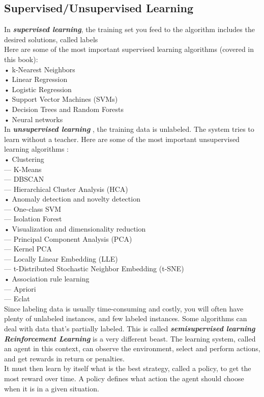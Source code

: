 \subsection*{Supervised/Unsupervised Learning}
In \textbf{\textit{supervised learning}}, the training set you feed to the algorithm includes the desired
solutions, called labels\\
Here are some of the most important supervised learning algorithms (covered in this
book):\\
• k-Nearest Neighbors\\
• Linear Regression\\
• Logistic Regression\\
• Support Vector Machines (SVMs)\\
• Decision Trees and Random Forests\\
• Neural networks\\

In \textbf{\textit{unsupervised learning}} , the training data is unlabeled. The system tries to learn without a teacher.
Here are some of the most important unsupervised learning algorithms :\\
• Clustering\\
— K-Means\\
— DBSCAN\\
— Hierarchical Cluster Analysis (HCA)\\
• Anomaly detection and novelty detection\\
— One-class SVM\\
— Isolation Forest\\
• Visualization and dimensionality reduction\\
— Principal Component Analysis (PCA)\\
— Kernel PCA\\
— Locally Linear Embedding (LLE)\\
— t-Distributed Stochastic Neighbor Embedding (t-SNE)\\
• Association rule learning\\
— Apriori\\
— Eclat\\
Since labeling data is usually time-consuming and costly, you will often have plenty of
unlabeled instances, and few labeled instances. Some algorithms can deal with data
that’s partially labeled. This is called \textbf{\textit{semisupervised learning}}\\

\textbf{\textit{Reinforcement Learning}} is a very different beast. The learning system, called an agent
in this context, can observe the environment, select and perform actions, and get
rewards in return or penalties.\\
It must then learn by itself what is the best strategy, called a policy, to get
the most reward over time. A policy defines what action the agent should choose
when it is in a given situation.\\


